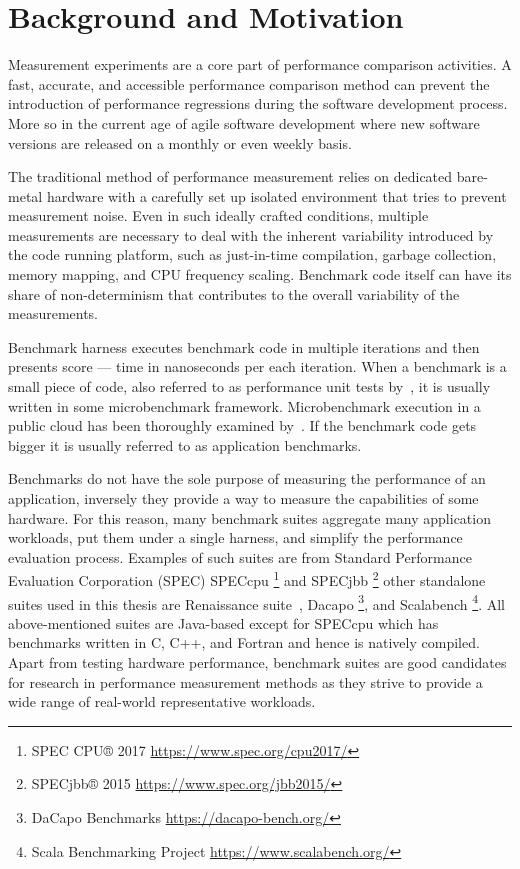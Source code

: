 \chapter{Background and Motivation}
\label{chap:background}

Measurement experiments are a core part of performance comparison activities.
A fast, accurate, and accessible performance comparison method can prevent the introduction of performance regressions during the software development process.
More so in the current age of agile software development where new software versions are released on a monthly or even weekly basis.

The traditional method of performance measurement relies on dedicated bare-metal hardware with a carefully set up isolated environment that tries to prevent measurement noise. 
Even in such ideally crafted conditions, multiple measurements are necessary to deal with the inherent variability introduced by the code running platform, such as just-in-time compilation, garbage collection, memory mapping, and CPU frequency scaling.
Benchmark code itself can have its share of non-determinism that contributes to the overall variability of the measurements.

Benchmark harness executes benchmark code in multiple iterations and then presents score --- time in nanoseconds per each iteration.
When a benchmark is a small piece of code, also referred to as performance unit tests by~\citet{horky2015unit}, it is usually written in some microbenchmark framework.
Microbenchmark execution in a public cloud has been thoroughly examined by~\citet{laaber2019software}.
If the benchmark code gets bigger it is usually referred to as application benchmarks.

Benchmarks do not have the sole purpose of measuring the performance of an application, inversely they provide a way to measure the capabilities of some hardware.
For this reason, many benchmark suites aggregate many application workloads, put them under a single harness, and simplify the performance evaluation process.
Examples of such suites are from Standard Performance Evaluation Corporation (SPEC) SPECcpu \footnote{SPEC CPU® 2017 \url{https://www.spec.org/cpu2017/}} and SPECjbb \footnote{SPECjbb® 2015 \url{https://www.spec.org/jbb2015/}} other standalone suites used in this thesis are Renaissance suite~\cite{prokopec2019renaissance}, Dacapo \footnote{DaCapo Benchmarks \url{https://dacapo-bench.org/}}, and Scalabench \footnote{Scala Benchmarking Project \url{https://www.scalabench.org/}}.
All above-mentioned suites are Java-based except for SPECcpu which has benchmarks written in C, C++, and Fortran and hence is natively compiled.
Apart from testing hardware performance, benchmark suites are good candidates for research in performance measurement methods as they strive to provide a wide range of real-world representative workloads.


